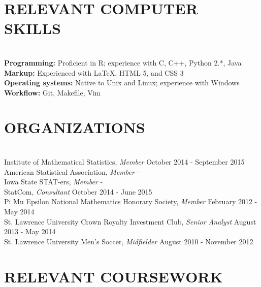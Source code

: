 \documentclass{res} %
\begin{document}
\begin{resume}

\section{RELEVANT COMPUTER SKILLS}

\hrulefill \\
{\bf Programming:} Proficient in R; experience with C, C++, Python 2.*, Java \\
{\bf Markup:} Experienced with \LaTeX, HTML 5, and CSS 3 \\
{\bf Operating systems:} Native to Unix and Linux; experience with Windows \\
{\bf Workflow:} Git, Makefile, Vim


\section{ORGANIZATIONS}

\hrulefill \\
Institute of Mathematical Statistics, {\sl Member} \dotfill October 2014 - September 2015\\
American Statistical Association, {\sl Member} \hfill - \\
Iowa State STAT-ers, {\sl Member} \hfill - \\
StatCom, {\sl Consultant} \dotfill October 2014 - June 2015\\
Pi Mu Epsilon National Mathematics Honorary Society, {\sl Member} \dotfill February 2012 - May 2014 \\
St. Lawrence University Crown Royalty Investment Club, {\sl Senior Analyst} \dotfill August 2013 - May 2014 \\
St. Lawrence University Men's Soccer, {\sl Midfielder} \dotfill August 2010 - November 2012 


\section{RELEVANT COURSEWORK}


\end{resume}
\end{document}
